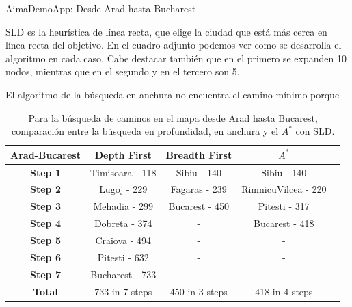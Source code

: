 \documentclass[11pt, a4paper, spanish, openright, twoside]{book}
\begin{document}
\begin{section}{AimaDemoApp: Desde Arad hasta Bucharest}


	
SLD es la heurística de línea recta, que elige la ciudad que está más cerca en línea recta del objetivo. En el cuadro adjunto podemos ver como se desarrolla el algoritmo en cada caso. Cabe destacar también que en el primero se expanden 10 nodos, mientras que en el segundo y en el tercero son 5.

El algoritmo de la búsqueda en anchura no encuentra el camino mínimo porque%

	\begin{table}	
		\begin{center}
			\begin{tabular}{|c||c|c|c|c|}
				\hline \textbf{Arad-Bucarest}	& \textbf{Depth First} 	& \textbf{Breadth First} 	& $A^*$ \\ \hline \hline
				\textbf{Step 1} 			&  	Timisoara - 118	& Sibiu - 140			& Sibiu - 140			\\ \hline 
				\textbf{Step 2} 			&  	Lugoj - 229		& Fagaras - 239		& RimnicuVilcea - 220	\\ \hline 
				\textbf{Step 3} 			&  	Mehadia - 299		& Bucarest - 450		& Pitesti - 317			\\ \hline 
				\textbf{Step 4} 			&  	Dobreta - 374		& -					& Bucarest - 418		\\ \hline 
				\textbf{Step 5} 			&  	Craiova - 494		& -					& -					\\ \hline 
				\textbf{Step 6} 			&  	Pitesti - 632		& -					& - 					\\ \hline 
				\textbf{Step 7} 			&  	Bucharest - 733	& -					& -					\\ \hline \hline
				\textbf{Total} 			&  	733 in 7 steps		&  450 in 3 steps		& 418 in 4 steps		\\ \hline 

			\end{tabular}
		\caption{Para la búsqueda de caminos en el mapa desde Arad hasta Bucarest, comparación entre la búsqueda en profundidad, en anchura y el $A^*$ con SLD.}
		\end{center}
	\end{table}


\end{section}
\end{document}
